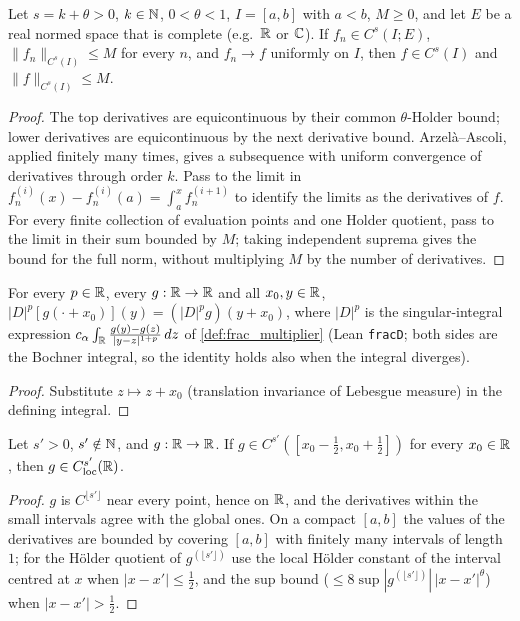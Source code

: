 \begin{lemma}
  \label{lem:c03_holder_closed_ball}
  Let $s=k+\theta>0$, $k\in\mathbb{N}$, $0<\theta<1$, $I=[a,b]$ with $a<b$, $M\ge0$, and let $E$ be a real normed
  space that is complete (e.g.\ $\mathbb{R}$ or $\mathbb{C}$).
  If $f_n\in C^s(I;E)$, $\|f_n\|_{C^s(I)}\le M$ for every $n$, and $f_n\to f$
  uniformly on $I$, then $f\in C^s(I)$ and $\|f\|_{C^s(I)}\le M$.
\end{lemma}
\begin{proof}
  The top derivatives are equicontinuous by their common $\theta$-Holder bound;
  lower derivatives are equicontinuous by the next derivative bound. Arzel\`a--Ascoli,
  applied finitely many times, gives a subsequence with uniform convergence of derivatives
  through order $k$. Pass to the limit in
  $f_n^{(i)}(x)-f_n^{(i)}(a)=\int_a^x f_n^{(i+1)}$ to identify the limits as the derivatives of $f$.
  For every finite collection of evaluation points and one Holder quotient, pass to the limit
  in their sum bounded by $M$; taking independent suprema gives the bound for the full norm,
  without multiplying $M$ by the number of derivatives.
\end{proof}

\begin{lemma}
  \label{lem:c03_frac_translate}
  For every $p\in\mathbb{R}$, every $g:\mathbb{R}\to\mathbb{R}$ and all $x_0,y\in\mathbb{R}$,
  $|D|^p[g(\cdot+x_0)](y)=(|D|^pg)(y+x_0)$, where $|D|^p$ is the singular-integral expression
  $c_\alpha\int_{\mathbb{R}}\frac{g(y)-g(z)}{|y-z|^{1+p}}\,dz$ of \cref{def:frac_multiplier} (Lean \texttt{fracD};
  both sides are the Bochner integral, so the identity holds also when the integral diverges).
\end{lemma}
\begin{proof}
  Substitute $z\mapsto z+x_0$ (translation invariance of Lebesgue measure) in the defining integral.
\end{proof}

\begin{lemma}
  \label{lem:c03_holder_glue}
  Let $s'>0$, $s'\notin\mathbb{N}$, and $g:\mathbb{R}\to\mathbb{R}$. If $g\in C^{s'}([x_0-\frac12,x_0+\frac12])$ for every
  $x_0\in\mathbb{R}$, then $g\in C^{s'}_{\textup{loc}}(\mathbb{R})$.
\end{lemma}
\begin{proof}
  $g$ is $C^{\lfloor s'\rfloor}$ near every point, hence on $\mathbb{R}$, and the derivatives within the small
  intervals agree with the global ones. On a compact $[a,b]$ the values of the derivatives are bounded by
  covering $[a,b]$ with finitely many intervals of length $1$; for the H\"older quotient of
  $g^{(\lfloor s'\rfloor)}$ use the local H\"older constant of the interval centred at $x$ when
  $|x-x'|\le\frac12$, and the sup bound ($\le 8\sup|g^{(\lfloor s'\rfloor)}|\,|x-x'|^{\theta}$) when $|x-x'|>\frac12$.
\end{proof}


